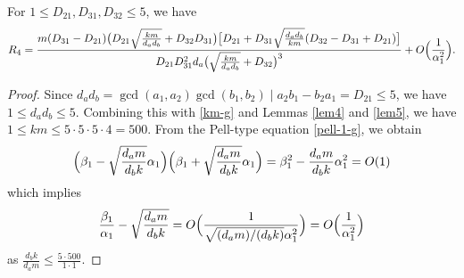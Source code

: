 \documentclass[10pt,a4paper]{amsart}
\begin{document}
\begin{lem} \label{lem14}
For $1 \le D_{21}, D_{31}, D_{32} \le 5$, we have
\begin{equation*}
    R_4 = \frac{m (D_{31}-D_{21}) \bigl( D_{21}\sqrt{\frac{k m}{d_a d_b}}+D_{32}{D_{31} \bigr)\bigl[ D_{21} + D_{31}\sqrt{\frac{d_a d_b}{k m}}(D_{32}-D_{31}+D_{21})}\bigr]}
    {D_{21}D_{31}^2 d_a\bigl( \sqrt{\frac{k m}{d_a d_b}}+D_{32} \bigr)^3} + O\Bigl(\frac{1}{\alpha_1^2}\Bigr).
\end{equation*}
\end{lem}

\begin{proof}
Since $d_a d_b = \gcd(a_1, a_2) \gcd(b_1, b_2) \mid a_2 b_1 - b_2 a_1 = D_{21} \le 5$, we have $1 \le d_a d_b \le 5$. Combining this with \eqref{km-g} and Lemmas \ref{lem4} and \ref{lem5}, we have $1 \le k m \le 5 \cdot 5 \cdot 5 \cdot 4 = 500$. From the Pell-type equation \eqref{pell-1-g}, we obtain
\[
\Bigl( \beta_1 - \sqrt{\frac{d_a m}{d_b k}} \alpha_1 \Bigr) \Bigl( \beta_1 + \sqrt{\frac{d_a m}{d_b k}} \alpha_1 \Bigr) = \beta_1^2 - \frac{d_a m}{d_b k} \alpha_1^2 = O(1)
\]
which implies
\begin{equation} \label{lem10}
\frac{\beta_1}{\alpha_1} - \sqrt{\frac{d_a m}{d_b k}} = O \Bigl( \frac{1}{\sqrt{(d_a m) / (d_b k)} \alpha_1^2} \Bigr) = O \Bigl( \frac{1}{\alpha_1^2} \Bigr)
\end{equation}
as $\frac{d_b k}{d_a m} \le \frac{5 \cdot 500}{1 \cdot 1}$. 

\bigskip


\end{proof}
\end{document}
